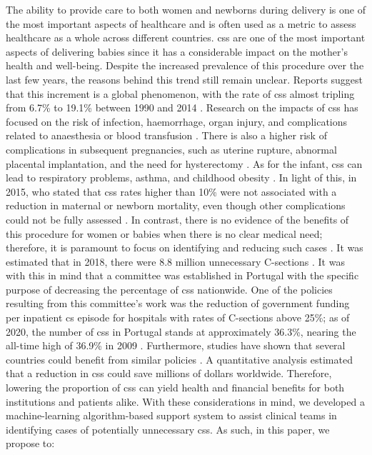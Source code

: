 The ability to provide care to both women and newborns during delivery is one of the most important aspects of healthcare and is often used as a metric to assess healthcare as a whole across different countries. \acp{cs} are one of the most important aspects of delivering babies since it has a considerable impact on the mother's health and well-being. Despite the increased prevalence of this procedure over the last few years, the reasons behind this trend still remain unclear. Reports suggest that this increment is a global phenomenon, with the rate of \acp{cs} almost tripling from 6.7\% to 19.1\% between 1990 and 2014 \cite{betranIncreasingTrendCaesarean2016,chenNonClinicalInterventions2018}. Research on the impacts of \acp{cs} has focused on the risk of infection, haemorrhage, organ injury, and complications related to anaesthesia or blood transfusion \cite{caesereanrisk1,caesereanrisk2}.
There is also a higher risk of complications in subsequent pregnancies, such as uterine rupture, abnormal placental implantation, and the need for hysterectomy \cite{caesereanrisk3,caesereanrisk4}. As for the infant, \acp{cs} can lead to respiratory problems, asthma, and childhood obesity \cite{caesereanrisk3}.
In light of this, in 2015, \ac{who} stated that \acp{cs} rates higher than 10\% were not associated with a reduction in maternal or newborn mortality, even though other complications could not be fully assessed \cite{worldhealthorganizationhumanreproductionprogramme10april2015WHOStatementCaesarean2015}. In contrast, there is no evidence of the benefits of this procedure for women or babies when there is no clear medical need; therefore, it is paramount to focus on identifying and reducing such cases \cite{chenNonClinicalInterventions2018}.  It was estimated that in 2018, there were 8.8 million unnecessary C-sections \cite{hoxhaCaesareanSectionsHealth2021}.
It was with this in mind that a committee was established in Portugal with the specific purpose of decreasing the percentage of \acp{cs} nationwide. One of the policies resulting from this committee's work was the reduction of government funding per inpatient \ac{cs} episode for hospitals with rates of C-sections above 25\%; as of 2020, the number of \acp{cs} in Portugal stands at approximately 36.3\%, nearing the all-time high of 36.9\% in 2009 \cite{pordatacesarianas}. Furthermore, studies have shown that several countries could benefit from similar policies \cite{hoxhaCaesareanSectionsHealth2021}.
A quantitative analysis estimated that a reduction in \acp{cs} could save millions of dollars \cite{callanderFinancingMaternityEarly2020} worldwide. Therefore, lowering the proportion of \acp{cs} can yield health and financial benefits for both institutions and patients alike. With these considerations in mind, we developed a machine-learning algorithm-based support system to assist clinical teams in identifying cases of potentially unnecessary \acp{cs}. As such, in this paper, we propose to:


